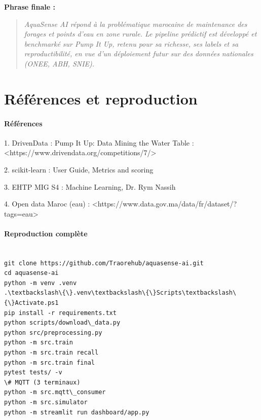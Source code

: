 \documentclass[11pt,a4paper]{report}
\begin{document}
\textbf{Phrase finale :}



\begin{quote}

\textit{AquaSense AI répond à la problématique marocaine de maintenance des forages et points d'eau en zone rurale. Le pipeline prédictif est développé et benchmarké sur Pump It Up, retenu pour sa richesse, ses labels et sa reproductibilité, en vue d'un déploiement futur sur des données nationales (ONEE, ABH, SNIE).}

\end{quote}





\chapter{Références et reproduction}



\subsubsection{Références}



1. DrivenData : Pump It Up: Data Mining the Water Table : <https://www.drivendata.org/competitions/7/>

2. scikit-learn : User Guide, Metrics and scoring

3. EHTP MIG S4 : Machine Learning, Dr. Rym Nassih

4. Open data Maroc (eau) : <https://www.data.gov.ma/data/fr/dataset/?tags=eau>



\subsubsection{Reproduction complète}



\begin{lstlisting}

git clone https://github.com/Traorehub/aquasense-ai.git
cd aquasense-ai
python -m venv .venv
.\textbackslash\{\}.venv\textbackslash\{\}Scripts\textbackslash\{\}Activate.ps1
pip install -r requirements.txt
python scripts/download\_data.py
python src/preprocessing.py
python -m src.train
python -m src.train recall
python -m src.train final
pytest tests/ -v
\# MQTT (3 terminaux)
python -m src.mqtt\_consumer
python -m src.simulator
python -m streamlit run dashboard/app.py

\end{lstlisting}
\end{document}
